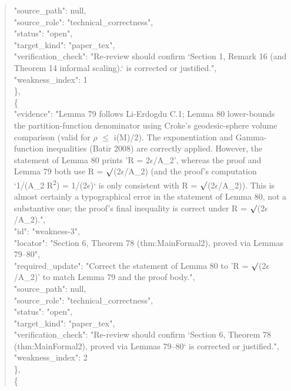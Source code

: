 \documentclass[11pt]{article}
\begin{document}
\begin{quote}
      "source\_path": null,\\
      "source\_role": "technical\_correctness",\\
      "status": "open",\\
      "target\_kind": "paper\_tex",\\
      "verification\_check": "Re-review should confirm `Section 1, Remark 16 (and Theorem 14 informal scaling).` is corrected or justified.",\\
      "weakness\_index": 1\\
    \},\\
    \{\\
      "evidence": "Lemma 79 follows Li-Erdogdu C.1; Lemma 80 lower-bounds the partition-function denominator using Croke's geodesic-sphere volume comparison (valid for \ensuremath{\rho} \ensuremath{\le} i(M)/2). The exponentiation and Gamma-function inequalities (Batir 2008) are correctly applied. However, the statement of Lemma 80 prints 'R = 2\ensuremath{\epsilon}/A\_2', whereas the proof and Lemma 79 both use R = \ensuremath{\surd}(2\ensuremath{\epsilon}/A\_2) (and the proof's computation `1/(A\_2 R\textsuperscript{2}) = 1/(2\ensuremath{\epsilon})` is only consistent with R = \ensuremath{\surd}(2\ensuremath{\epsilon}/A\_2)). This is almost certainly a typographical error in the statement of Lemma 80, not a substantive one; the proof's final inequality is correct under R = \ensuremath{\surd}(2\ensuremath{\epsilon}/A\_2).",\\
      "id": "weakness-3",\\
      "locator": "Section 6, Theorem 78 (thm:MainFormal2), proved via Lemmas 79--80",\\
      "required\_update": "Correct the statement of Lemma 80 to 'R = \ensuremath{\surd}(2\ensuremath{\epsilon}/A\_2)' to match Lemma 79 and the proof body.",\\
      "source\_path": null,\\
      "source\_role": "technical\_correctness",\\
      "status": "open",\\
      "target\_kind": "paper\_tex",\\
      "verification\_check": "Re-review should confirm `Section 6, Theorem 78 (thm:MainFormal2), proved via Lemmas 79--80` is corrected or justified.",\\
      "weakness\_index": 2\\
    \},\\
    \{\\

\end{quote}
\end{document}
